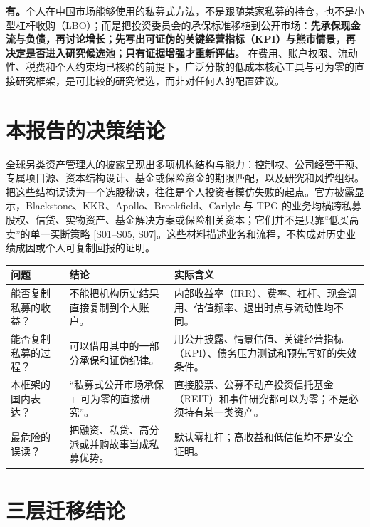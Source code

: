 \begin{keyinsight}[一句话答案]
\textbf{有。}个人在中国市场能够使用的私募式方法，不是跟随某家私募的持仓，也不是小型杠杆收购（LBO）；而是把投资委员会的承保标准移植到公开市场：\textbf{先承保现金流与负债，再讨论增长；先写出可证伪的关键经营指标（KPI）与熊市情景，再决定是否进入研究候选池；只有证据增强才重新评估。} 在费用、账户权限、流动性、税费和个人约束均已核验的前提下，广泛分散的低成本核心工具与可为零的直接研究框架，是可比较的研究候选，而非对任何人的配置建议。
\end{keyinsight}

\section{本报告的决策结论}

全球另类资产管理人的披露呈现出多项机构结构与能力：控制权、公司经营干预、专属项目源、资本结构设计、基金或保险资金的期限匹配，以及研究和风控组织。把这些结构误读为一个选股秘诀，往往是个人投资者模仿失败的起点。官方披露显示，Blackstone、KKR、Apollo、Brookfield、Carlyle 与 TPG 的业务均横跨私募股权、信贷、实物资产、基金解决方案或保险相关资本；它们并不是只靠“低买高卖”的单一买断策略 [S01--S05, S07]。这些材料描述业务和流程，不构成对历史业绩成因或个人可复制回报的证明。

\begin{exhibitbox}
\small
\begin{tabularx}{\exhibitboxwidth}{L{3.2cm}X L{3.0cm}}
\toprule
\textbf{问题} & \textbf{结论} & \textbf{实际含义} \\
\midrule
能否复制私募的收益？ & 不能把机构历史结果直接复制到个人账户。 & 内部收益率（IRR）、费率、杠杆、现金调用、估值频率、退出时点与流动性均不同。 \\
能否复制私募的过程？ & 可以借用其中的一部分承保和证伪纪律。 & 用公开披露、情景估值、关键经营指标（KPI）、债务压力测试和预先写好的失效条件。 \\
本框架的国内表达？ & “私募式公开市场承保 + 可为零的直接研究”。 & 直接股票、公募不动产投资信托基金（REIT）和事件研究都可以为零；不是必须持有某一类资产。 \\
最危险的误读？ & 把融资、私贷、高分派或并购故事当成私募优势。 & 默认零杠杆；高收益和低估值均不是安全证明。 \\
\bottomrule
\end{tabularx}
\end{exhibitbox}

\section{三层迁移结论}

